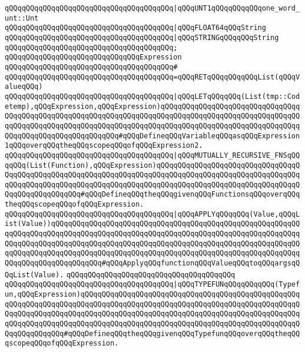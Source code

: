 \verb|qQQqqQQqqQQqqQQqqQQqqQQqqQQqqQQqqQQqqQQq|\verb#|qQQqUNT1qQQqqQQqqQQqone_word_unt::Unt#\newline
\verb|qQQqqQQqqQQqqQQqqQQqqQQqqQQqqQQqqQQqqQQq|\verb#|qQQqFLOAT64qQQqString#\newline
\verb|qQQqqQQqqQQqqQQqqQQqqQQqqQQqqQQqqQQqqQQq|\verb#|qQQqSTRINGqQQqqQQqString#\newline
\verb|qQQqqQQqqQQqqQQqqQQqqQQqqQQqqQQqqQQqqQQq;|\newline
\newline
\newline
\verb|qQQqqQQqqQQqqQQqqQQqqQQqqQQqqQQqExpression|\newline
\verb|qQQqqQQqqQQqqQQqqQQqqQQqqQQqqQQqqQQqqQQq#|\newline
\verb|qQQqqQQqqQQqqQQqqQQqqQQqqQQqqQQqqQQqqQQq=qQQqRETqQQqqQQqqQQqList(qQQqValueqQQq)|\newline
\verb|qQQqqQQqqQQqqQQqqQQqqQQqqQQqqQQqqQQqqQQq|\verb#|qQQqLETqQQqqQQq(List(tmp::Codetemp),qQQqExpression,qQQqExpression)qQQqqQQqqQQqqQQqqQQqqQQqqQQqqQQqqQQqqQQqqQQqqQQqqQQqqQQqqQQqqQQqqQQqqQQqqQQqqQQqqQQqqQQqqQQqqQQqqQQqqQQqqQQqqQQqqQQqqQQqqQQqqQQqqQQqqQQqqQQqqQQqqQQqqQQqqQQqqQQqqQQqqQQqqQQqqQQqqQQqqQQqqQQqqQQqqQQqqQQq#\verb|#qQQqDefineqQQqVariableqQQqasqQQqExpression1qQQqoverqQQqtheqQQqscopeqQQqofqQQqExpression2.|\newline
\newline
\verb|qQQqqQQqqQQqqQQqqQQqqQQqqQQqqQQqqQQqqQQq|\verb#|qQQqMUTUALLY_RECURSIVE_FNSqQQqqQQq(List(Function),qQQqExpression)qQQqqQQqqQQqqQQqqQQqqQQqqQQqqQQqqQQqqQQqqQQqqQQqqQQqqQQqqQQqqQQqqQQqqQQqqQQqqQQqqQQqqQQqqQQqqQQqqQQqqQQqqQQqqQQqqQQqqQQqqQQqqQQqqQQqqQQqqQQqqQQqqQQqqQQqqQQqqQQqqQQqqQQqqQQqqQQqqQQqqQQqqQQqqQQq#\verb|#qQQqDefineqQQqtheqQQqgivenqQQqFunctionsqQQqoverqQQqtheqQQqscopeqQQqofqQQqExpression.|\newline
\verb|qQQqqQQqqQQqqQQqqQQqqQQqqQQqqQQqqQQqqQQq|\verb#|qQQqAPPLYqQQqqQQq(Value,qQQqList(Value))qQQqqQQqqQQqqQQqqQQqqQQqqQQqqQQqqQQqqQQqqQQqqQQqqQQqqQQqqQQqqQQqqQQqqQQqqQQqqQQqqQQqqQQqqQQqqQQqqQQqqQQqqQQqqQQqqQQqqQQqqQQqqQQqqQQqqQQqqQQqqQQqqQQqqQQqqQQqqQQqqQQqqQQqqQQqqQQqqQQqqQQqqQQqqQQqqQQqqQQqqQQqqQQqqQQqqQQqqQQqqQQqqQQqqQQqqQQqqQQqqQQqqQQqqQQqqQQqqQQqqQQqqQQqqQQqqQQqqQQqqQQqqQQqqQQq#\verb|#qQQqApplyqQQqfunctionqQQqValueqQQqtoqQQqargsqQQqList(Value).|\newline
\verb|qQQqqQQqqQQqqQQqqQQqqQQqqQQqqQQqqQQqqQQq|\newline
\verb|qQQqqQQqqQQqqQQqqQQqqQQqqQQqqQQqqQQqqQQq|\verb#|qQQqTYPEFUNqQQqqQQqqQQq(Typefun,qQQqExpression)qQQqqQQqqQQqqQQqqQQqqQQqqQQqqQQqqQQqqQQqqQQqqQQqqQQqqQQqqQQqqQQqqQQqqQQqqQQqqQQqqQQqqQQqqQQqqQQqqQQqqQQqqQQqqQQqqQQqqQQqqQQqqQQqqQQqqQQqqQQqqQQqqQQqqQQqqQQqqQQqqQQqqQQqqQQqqQQqqQQqqQQqqQQqqQQqqQQqqQQqqQQqqQQqqQQqqQQqqQQqqQQqqQQqqQQqqQQqqQQqqQQqqQQqqQQqqQQqqQQqqQQqqQQqqQQqqQQq#\verb|#qQQqDefineqQQqtheqQQqgivenqQQqTypefunqQQqoverqQQqtheqQQqscopeqQQqofqQQqExpression.|\newline
